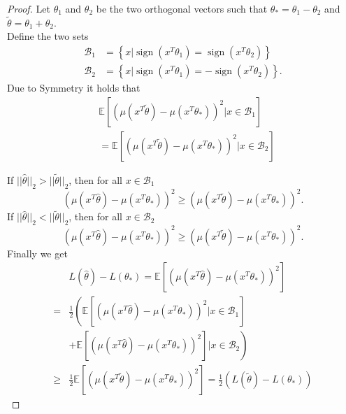 \documentclass[twoside]{article} \usepackage{aistats2017}
\newcommand{\EV}[1] {
  \mathbb{E}\left[#1\right]}
\newcommand{\sign} {
  \operatorname{sign}}
\begin{document}
\begin{proof}
Let $\theta_1$ and $\theta_2$ be the two orthogonal vectors such that $\theta_* = \theta_1-\theta_2$ and $\tilde{\theta}=\theta_1+\theta_2$.\\
Define the two sets
\begin{align*}
\mathcal{B}_1 &= \left\{x|\sign(x^T\theta_1)=\sign(x^T\theta_2)\right\}\\ 
\mathcal{B}_2 &= \left\{x|\sign(x^T\theta_1)=-\sign(x^T\theta_2)\right\}.
\end{align*}
Due to Symmetry it holds that 
\begin{align*}
&\EV{(\mu(x^T\tilde{\theta})-\mu(x^T\theta_*))^2|x\in\mathcal{B}_1}\\
&=\EV{(\mu(x^T\tilde{\theta})-\mu(x^T\theta_*))^2|x\in\mathcal{B}_2}
\end{align*}
    
If $||\hat{\theta}||_2 > ||\tilde{\theta}||_2$, then for all $x\in \mathcal{B}_1$ $$(\mu(x^T\hat{\theta})-\mu(x^T\theta_*))^2 \geq (\mu(x^T\tilde{\theta})-\mu(x^T\theta_*))^2.$$
If $||\hat{\theta}||_2 < ||\tilde{\theta}||_2$, then for all $x\in \mathcal{B}_2$ $$(\mu(x^T\hat{\theta})-\mu(x^T\theta_*))^2 \geq (\mu(x^T\tilde{\theta})-\mu(x^T\theta_*))^2.$$
Finally we get
\begin{align*}
     &L(\hat{\theta})-L(\theta_*) = \EV{(\mu(x^T\hat{\theta})-\mu(x^T\theta_*))^2}\\
     =& \frac{1}{2}\left(\EV{(\mu(x^T\hat{\theta})-\mu(x^T\theta_*))^2|x\in\mathcal{B}_1}\right.\\
     &\left.+\EV{(\mu(x^T\hat{\theta})-\mu(x^T\theta_*))^2}|x\in\mathcal{B}_2\right)\\
     \geq& \frac{1}{2}\EV{(\mu(x^T\tilde{\theta})-\mu(x^T\theta_*))^2}=\frac{1}{2}(L(\tilde{\theta})-L(\theta_*))
\end{align*}
\end{proof}
\end{document}
